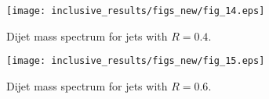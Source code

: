 \begin{figure}[tbp]
\begin{centering}
\texttt{[image: inclusive\_results/figs\_new/fig\_14.eps]}
\caption[Dijet mass spectrum, $R$ = 0.4]{Dijet mass spectrum for \akt jets with $R = 0.4$.}
\label{result_dijet_mass_4}
\end{centering}
\end{figure}

\begin{figure}[tbp]
\begin{centering}
\texttt{[image: inclusive\_results/figs\_new/fig\_15.eps]}
\caption[Dijet mass spectrum, $R$ = 0.6]{Dijet mass spectrum for \akt jets with $R = 0.6$.}
\label{result_dijet_mass_6}
\end{centering}
\end{figure}


